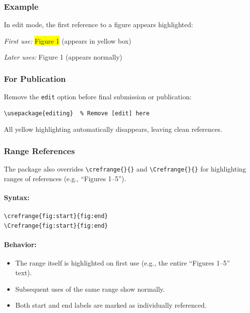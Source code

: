 \documentclass[11pt]{article}
\begin{document}
\subsubsection{Example}

In edit mode, the first reference to a figure appears highlighted:

\textit{First use:} \colorbox{yellow}{Figure 1}  (appears in yellow box)

\textit{Later uses:} Figure 1 (appears normally)

\subsubsection{For Publication}

Remove the \verb|edit| option before final submission or publication:

\begin{verbatim}
\usepackage{editing}  % Remove [edit] here
\end{verbatim}

All yellow highlighting automatically disappears, leaving clean references.

\subsubsection{Range References}

The package also overrides \verb|\crefrange{}{}| and \verb|\Crefrange{}{}| 
for highlighting ranges of references (e.g., ``Figures 1--5'').

\paragraph{Syntax:}
\begin{verbatim}
\crefrange{fig:start}{fig:end}
\Crefrange{fig:start}{fig:end}
\end{verbatim}

\paragraph{Behavior:}
\begin{itemize}
  \item The range itself is highlighted on first use (e.g., the entire ``Figures 1--5'' text).
  \item Subsequent uses of the same range show normally.
  \item Both start and end labels are marked as individually referenced.
\end{itemize}
\end{document}
